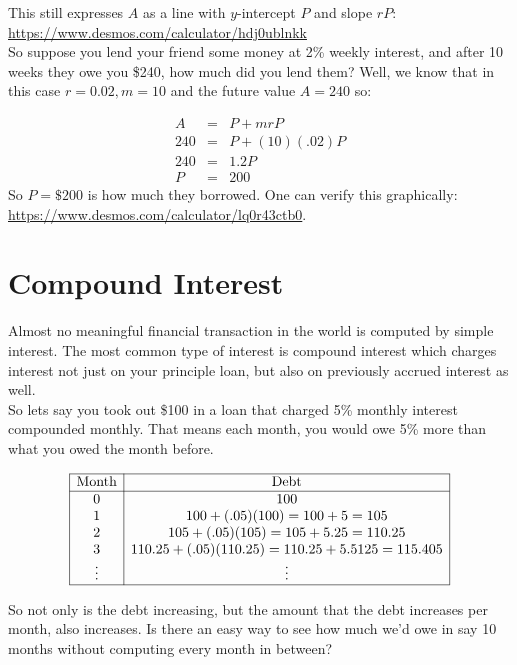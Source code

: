 This still expresses $A$ as a line with $y$-intercept $P$ and slope $rP$: \url{https://www.desmos.com/calculator/hdj0ublnkk}\\

So suppose you lend your friend some money at 2\% weekly interest, and after 10 weeks they owe you \$240, how much did you lend them?  Well, we know that in this case $r=0.02, m=10$ and the future value $A=240$ so:

\begin{eqnarray*}
A&=&P+mrP\\
240&=&P+(10)(.02)P\\
240&=&1.2P\\
P&=&200
\end{eqnarray*}
 So $P=\$200$ is how much they borrowed.  One can verify this graphically: \url{https://www.desmos.com/calculator/lq0r43ctb0}.
 
 
 \section{Compound Interest}\label{Section:CompoundInterest}

Almost no meaningful financial transaction in the world is computed by simple interest.  The most common type of interest is compound interest which charges interest not just on your principle loan, but also on previously accrued interest as well.\\

So lets say you took out \$100 in a loan that charged 5\% monthly interest compounded monthly.  That means each month, you would owe 5\% more than what you owed the month before.


$$\begin{array}{|c|c|}
\hline
\text{Month} & \text{Debt}\\
\hline
0 & 100\\
1& 100+(.05)(100)=100+5=105\\
2& 105+(.05)(105)=105+5.25=110.25\\
3 & 110.25+(.05)(110.25)=110.25+5.5125=115.405\\
\vdots & \vdots\\
\hline
\end{array}$$

So not only is the debt increasing, but the amount that the debt increases per month, also increases.  Is there an easy way to see how much we'd owe in say 10 months without computing every month in between?\\

